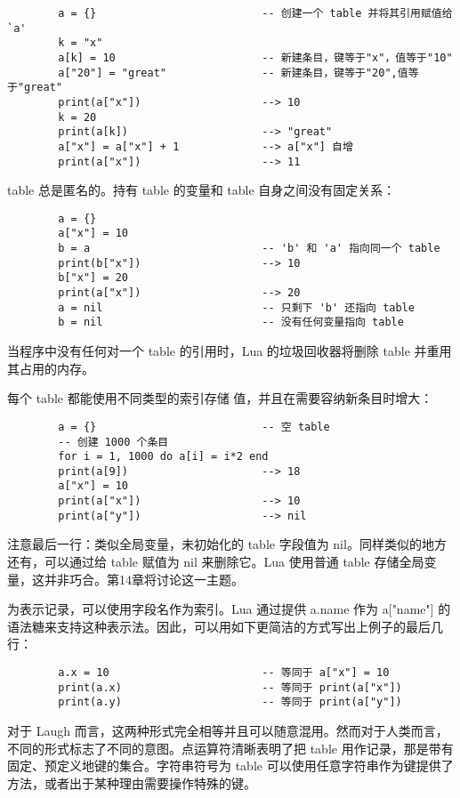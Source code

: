 {{\begin{verbatim}
        a = {}                          -- 创建一个 table 并将其引用赋值给 `a'
        k = "x"
        a[k] = 10                       -- 新建条目，键等于"x"，值等于"10"
        a["20"] = "great"               -- 新建条目，键等于"20",值等于"great"
        print(a["x"])                   --> 10
        k = 20
        print(a[k])                     --> "great"
        a["x"] = a["x"] + 1             --> a["x"] 自增
        print(a["x"])                   --> 11
\end{verbatim}

table 总是匿名的。持有 table 的变量和 table 自身之间没有固定关系：

\begin{verbatim}
        a = {}
        a["x"] = 10
        b = a                           -- 'b' 和 'a' 指向同一个 table
        print(b["x"])                   --> 10
        b["x"] = 20
        print(a["x"])                   --> 20
        a = nil                         -- 只剩下 'b' 还指向 table
        b = nil                         -- 没有任何变量指向 table
\end{verbatim}
当程序中没有任何对一个 table 的引用时，Lua 的垃圾回收器将删除 table 并重用其占用的内存。

每个 table 都能使用不同类型的索引存储 值，并且在需要容纳新条目时增大：
\begin{verbatim}
        a = {}                          -- 空 table
        -- 创建 1000 个条目
        for i = 1, 1000 do a[i] = i*2 end
        print(a[9])                     --> 18
        a["x"] = 10
        print(a["x"])                   --> 10
        print(a["y"])                   --> nil
\end{verbatim}
注意最后一行：类似全局变量，未初始化的 table 字段值为 nil。同样类似的地方还有，可以通过给 table 赋值为 nil 来删除它。Lua 使用普通 table 存储全局变量，这并非巧合。第14章将讨论这一主题。

为表示记录，可以使用字段名作为索引。Lua 通过提供 a.name 作为 a["name"] 的语法糖来支持这种表示法。因此，可以用如下更简洁的方式写出上例子的最后几行：

\begin{verbatim}
        a.x = 10                        -- 等同于 a["x"] = 10
        print(a.x)                      -- 等同于 print(a["x"])
        print(a.y)                      -- 等同于 print(a["y"])
\end{verbatim}
对于 Laugh 而言，这两种形式完全相等并且可以随意混用。然而对于人类而言，不同的形式标志了不同的意图。点运算符清晰表明了把 table 用作记录，那是带有固定、预定义地键的集合。字符串符号为 table 可以使用任意字符串作为键提供了方法，或者出于某种理由需要操作特殊的键。

}}
